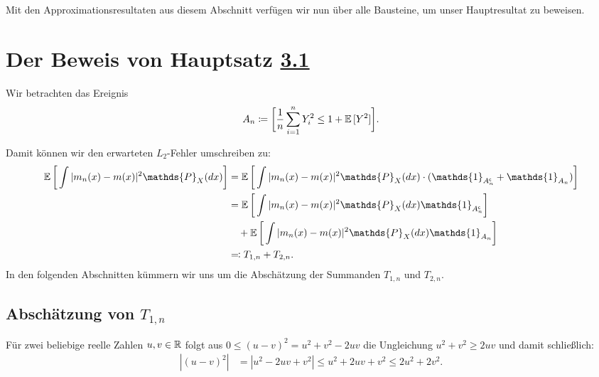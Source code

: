 Mit den Approximationsresultaten aus diesem Abschnitt verfügen wir nun über alle Bausteine, um unser Hauptresultat zu beweisen.

\section{Der Beweis von Hauptsatz \hyperref[optstop]{3.1}}

Wir betrachten das Ereignis 
\begin{equation}
\label{event}
A_n \coloneqq \bigg[\frac{1}{n} \sum_{i = 1}^n Y_i^2 \leq 1 + \mathbb{E}\,[Y^2]\bigg].
\end{equation}

Damit können wir den erwarteten $L_2$-Fehler umschreiben zu:
\begin{equation}
\label{originaleq}
\begin{split}
\E \bigg[\int |m_n(x) - m(x)|^2 \mathds{P}_X(dx)\bigg] & = \E \bigg[\int |m_n(x) - m(x)|^2 \mathds{P}_X(dx) \cdot (\mathds{1}_{A_n^{\mathsf{c}}} + \mathds{1}_{A_n})\bigg] \\
& = \E \bigg[\int |m_n(x) - m(x)|^2 \mathds{P}_X(dx) \mathds{1}_{A_n^{\mathsf{c}}}\bigg] \\
& \quad + \E \bigg[\int |m_n(x) - m(x)|^2 \mathds{P}_X(dx) \mathds{1}_{A_n}\bigg] \\
& \eqqcolon T_{1,n} + T_{2,n}.
\end{split}
\end{equation}
In den folgenden Abschnitten kümmern wir uns um die Abschätzung der Summanden $T_{1,n}$ und $T_{2,n}$.

\subsection{Abschätzung von $T_{1,n}$}

Für zwei beliebige reelle Zahlen $u, v \in \mathbb{R}$ folgt aus $0 \leq (u - v)^2 = u^2 + v^2 - 2uv$ die Ungleichung $u^2 + v^2 \geq 2uv$ und damit schließlich:
\begin{equation}
\label{ungl}
\begin{split}
|(u - v)^2| & = |u^2 - 2uv + v^2|
\leq  u^2 + 2uv + v^2
\leq 2u^2 + 2v^2.
\end{split}
\end{equation}

